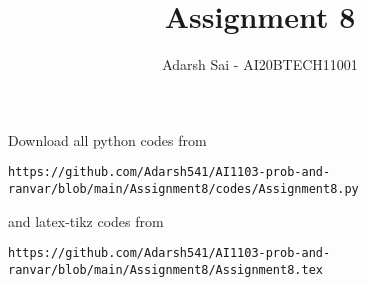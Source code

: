 \documentclass[journal,12pt,twocolumn]{IEEEtran}
\DeclareMathOperator*{\Res}{Res}
\begin{document}
\newcommand{\BEQA}{\begin{eqnarray}}
\newcommand{\EEQA}{\end{eqnarray}}
\newcommand{\define}{\stackrel{\triangle}{=}}

\raggedbottom
\setlength{\parindent}{0pt}
\providecommand{\mbf}{\mathbf}
\providecommand{\pr}[1]{\ensuremath{\Pr\left(#1\right)}}
\providecommand{\qfunc}[1]{\ensuremath{Q\left(#1\right)}}
\providecommand{\sbrak}[1]{\ensuremath{{}\left[#1\right]}}
\providecommand{\lsbrak}[1]{\ensuremath{{}\left[#1\right.}}
\providecommand{\rsbrak}[1]{\ensuremath{{}\left.#1\right]}}
\providecommand{\brak}[1]{\ensuremath{\left(#1\right)}}
\providecommand{\lbrak}[1]{\ensuremath{\left(#1\right.}}
\providecommand{\rbrak}[1]{\ensuremath{\left.#1\right)}}
\providecommand{\cbrak}[1]{\ensuremath{\left\{#1\right\}}}
\providecommand{\lcbrak}[1]{\ensuremath{\left\{#1\right.}}
\providecommand{\rcbrak}[1]{\ensuremath{\left.#1\right\}}}
\theoremstyle{remark}
\newtheorem{rem}{Remark}
\newcommand{\sgn}{\mathop{\mathrm{sgn}}}
\providecommand{\abs}[1]{\vert#1\vert}
\providecommand{\res}[1]{\Res\displaylimits_{#1}} 
\providecommand{\norm}[1]{\lVert#1\rVert}
\providecommand{\mtx}[1]{\mathbf{#1}}
\providecommand{\mean}[1]{E[ #1 ]}
\providecommand{\fourier}{\overset{\mathcal{F}}{ \rightleftharpoons}}
\providecommand{\system}{\overset{\mathcal{H}}{ \longleftrightarrow}}
\newcommand{\solution}{\noindent \textbf{Solution: }}
\newcommand{\cosec}{\,\text{cosec}\,}
\providecommand{\dec}[2]{\ensuremath{\overset{#1}{\underset{#2}{\gtrless}}}}
\newcommand{\myvec}[1]{\ensuremath{\begin{pmatrix}#1\end{pmatrix}}}
\newcommand{\mydet}[1]{\ensuremath{\begin{vmatrix}#1\end{vmatrix}}}
\makeatletter
{}
\makeatother
\let\StandardTheFigure\thefigure
\let\vec\mathbf
\renewcommand{\thefigure}{\theproblem}
\def\putbox#1#2#3{\makebox[0in][l]{\makebox[#1][l]{}\raisebox{\baselineskip}[0in][0in]{\raisebox{#2}[0in][0in]{#3}}}}
     \def\rightbox#1{\makebox[0in][r]{#1}}
     \def\centbox#1{\makebox[0in]{#1}}
     \def\topbox#1{\raisebox{-\baselineskip}[0in][0in]{#1}}
     \def\midbox#1{\raisebox{-0.5\baselineskip}[0in][0in]{#1}}
\vspace{3cm}
\title{Assignment 8}
\author{Adarsh Sai - AI20BTECH11001}
\maketitle
\newpage
\bigskip
\renewcommand{\thefigure}{\theenumi}
\renewcommand{\thetable}{\theenumi}
Download all python codes from 
\begin{lstlisting}
https://github.com/Adarsh541/AI1103-prob-and-ranvar/blob/main/Assignment8/codes/Assignment8.py
\end{lstlisting}
%
and latex-tikz codes from 
%
\begin{lstlisting}
https://github.com/Adarsh541/AI1103-prob-and-ranvar/blob/main/Assignment8/Assignment8.tex
\end{lstlisting}
\end{document}

